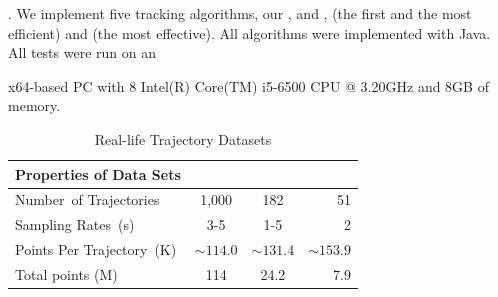 .
We implement five tracking algorithms, \ie our \citt, \sitt and \bitt, \ldrh (the first and the most efficient) and \grts (the most effective).
All algorithms were implemented with Java.
All tests were run on an {x64-based  PC with 8 Intel(R) Core(TM) i5-6500 CPU @ 3.20GHz and 8GB of memory.


\begin{table}[tb!]
	\renewcommand{\arraystretch}{1.20}
	\caption{\small Real-life Trajectory Datasets}
	\vspace{-1.5ex}
	\centering
	\footnotesize
	\begin{tabular}{|l|c|c|r|}
		\hline
		\bf{ Properties of Data Sets} & \sercar      &\geolife   &\mopsi \\
		\hline
		{Number\ of Trajectories}	&1,000	    &182	    & 51  \\
		\hline
		{Sampling Rates\ (s)} &3-5  & 1-5 & 2 \\
		\hline
		{Points Per Trajectory\ (K)}  &	$\sim114.0$    &$\sim131.4$	    & $\sim153.9$ \\
		\hline
		{Total points (M)} &114   	    	&24.2    &7.9\\
		\hline
	\end{tabular}
	\label{tab:datasets}
	\vspace{-2ex}
\end{table}



}
